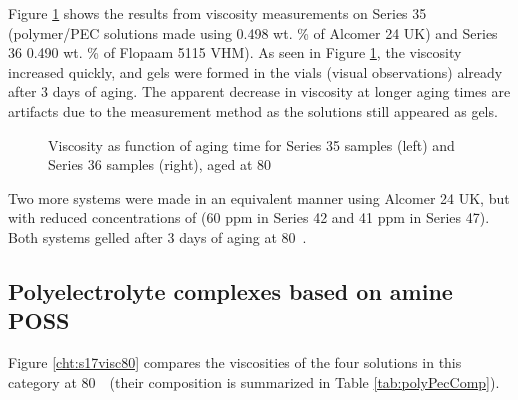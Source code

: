 Figure \ref{cht:s3536visc} shows the results from viscosity measurements on Series 35 (polymer/PEC solutions made using 0.498 wt. \% of Alcomer 24 UK) and Series 36  0.490 wt. \% of Flopaam 5115 VHM). As seen in Figure \ref{cht:s3536visc}, the viscosity increased quickly, and gels were formed in the vials (visual observations) already after 3 days of aging. The apparent decrease in viscosity at longer aging times are artifacts due to the measurement method as the solutions still appeared as gels.

\begin{figure}
    \centering
    \caption{Viscosity as function of aging time for Series 35 samples (left) and Series 36 samples (right), aged at 80~\celsius}
    \label{cht:s3536visc}
\end{figure}

Two more systems were made in an equivalent manner using Alcomer 24 UK, but with reduced concentrations of  (60 ppm in Series 42 and 41 ppm in Series 47). Both systems gelled after 3 days of aging at 80~\celsius.

\subsection{Polyelectrolyte complexes based on amine POSS}
 Figure \ref{cht:s17visc80} compares the viscosities of the four solutions in this category at 80~\celsius~(their composition is summarized in Table \ref{tab:polyPecComp}).


